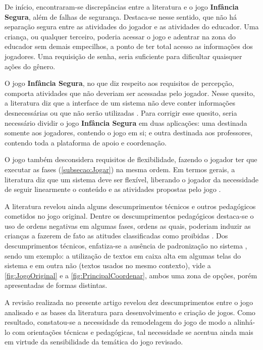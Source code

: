 \documentclass[alpha-refs,brazilian]{RBCA_v2.0}
\begin{document}
\pagebreak

De início, encontraram-se discrepâncias entre a literatura e o jogo \textbf{Infância Segura}, além de falhas de segurança. Destaca-se nesse sentido, que não há separação segura entre as atividades do jogador e as atividades do educador. Uma criança, ou qualquer terceiro, poderia acessar o jogo e adentrar na zona do educador sem demais empecilhos, a ponto de ter total acesso as informações dos jogadores. Uma requisição de senha, seria suficiente para dificultar quaisquer ações do gênero. %

O jogo \textbf{Infância Segura}, no que diz respeito aos requisitos de percepção, comporta atividades que não deveriam ser acessadas pelo jogador. Nesse quesito, a literatura diz que a interface de um sistema não deve conter informações desnecessárias ou que não serão utilizadas \citep{mantau2013analise}. Para corrigir esse quesito, seria necessário dividir o jogo \textbf{Infância Segura} em duas aplicações: uma destinada somente aos jogadores, contendo o jogo em si; e outra destinada aos professores, contendo toda a plataforma de apoio e coordenação.

O jogo também desconsidera requisitos de flexibilidade, fazendo o jogador ter que executar as fases (\cref{subsecao:Jogar}) na mesma ordem. Em termos gerais, a literatura diz que um sistema deve ser flexível, liberando o jogador da necessidade de seguir linearmente o conteúdo e as atividades propostas pelo jogo \citep{mano2005interfaces}.

A literatura revelou ainda alguns descumprimentos técnicos e outros pedagógicos cometidos no jogo original. Dentre os descumprimentos pedagógicos destaca-se o uso de ordens negativas em algumas fases, ordens as quais, poderiam induzir as crianças a fazerem de fato as atitudes classificadas como proibidas \citep{florentino2015possiveis}. Dos descumprimentos técnicos, enfatiza-se a ausência de padronização no sistema \citep{nielsen1993usability}, sendo um exemplo: a utilização de textos em caixa alta em algumas telas do sistema e em outra não (textos usados no mesmo contexto), vide a \cref{fig:JogoOriginal} e a \cref{fig:PrincipalCoordenar}, ambos uma zona de opções, porém apresentadas de formas distintas.

A revisão realizada no presente artigo revelou dez descumprimentos entre o jogo analisado e as bases da literatura para desenvolvimento e criação de jogos. Como resultado, constatou-se a necessidade da remodelagem do jogo de modo a alinhá-lo com orientações técnicas e pedagógicas, tal necessidade se acentua ainda mais em virtude da sensibilidade da temática do jogo revisado.
\end{document}
